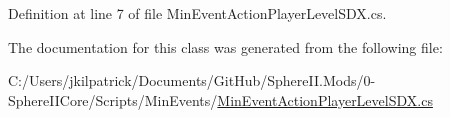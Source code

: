 Definition at line 7 of file Min\+Event\+Action\+Player\+Level\+S\+D\+X.\+cs.



The documentation for this class was generated from the following file\+:\begin{DoxyCompactItemize}
\item 
C\+:/\+Users/jkilpatrick/\+Documents/\+Git\+Hub/\+Sphere\+I\+I.\+Mods/0-\/\+Sphere\+I\+I\+Core/\+Scripts/\+Min\+Events/\mbox{\hyperlink{_min_event_action_player_level_s_d_x_8cs}{Min\+Event\+Action\+Player\+Level\+S\+D\+X.\+cs}}\end{DoxyCompactItemize}
